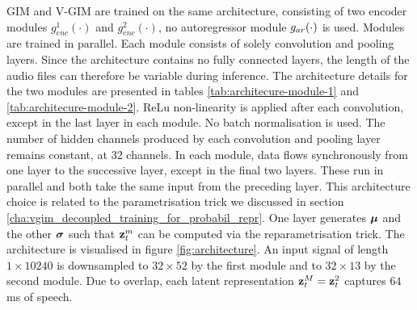 		GIM and V-GIM are trained on the same architecture, consisting of two encoder modules $g_{enc}^1(\cdot)$ and $g_{enc}^2(\cdot)$, no autoregressor module $g_{ar}(\cdot)$ is used. Modules are trained in parallel. Each module consists of solely convolution and pooling layers. Since the architecture contains no fully connected layers, the length of the audio files can therefore be variable during inference. The architecture details for the two modules are presented in tables \ref{tab:architecure-module-1} and \ref{tab:architecure-module-2}. ReLu non-linearity is applied after each convolution, except in the last layer in each module. No batch normalisation is used. The number of hidden channels produced by each convolution and pooling layer remains constant, at 32 channels. In each module, data flows synchronously from one layer to the successive layer, except in the final two layers. These run in parallel and both take the same input from the preceding layer. This architecture choice is related to the parametrisation trick we discussed in section \ref{cha:vgim_decoupled_training_for_probabil_repr}. One layer generates $\bm{\mu}$ and the other $\bm{\sigma}$ such that $\mathbf{z}_t^{m}$ can be computed via the reparametrisation trick. The architecture is visualised in figure \ref{fig:architecture}. 
		An input signal of length $1 \times 10240$ is downsampled to $32 \times 52$ by the first module and to $32 \times 13$ by the second module. Due to overlap, each latent representation $\mathbf{z}_t^M = \mathbf{z}_t^2$ captures $64$ms of speech. %
		

	
		

